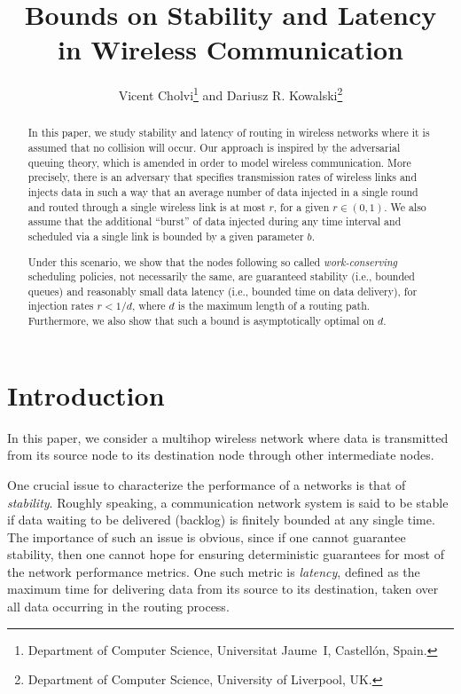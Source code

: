 \documentclass[journal,twocolumn]{./IEEEtran}
\begin{document}
\title{Bounds on Stability and Latency\\ in Wireless Communication}
\author{Vicent Cholvi\thanks{Department of Computer Science, Universitat Jaume~I, Castell\'on, Spain.}
and
Dariusz R. Kowalski\thanks{Department of Computer Science, University of Liverpool, UK.}
}

\date{}

\maketitle

\begin{abstract}
In this paper, we study stability and latency of routing in wireless networks where it is assumed that no collision will occur.  Our approach is inspired by the adversarial queuing theory, which is amended in order to model wireless communication. More precisely, there is an adversary that specifies transmission rates of wireless links and injects data in such a way that an average number of data injected in a single round and routed through a single
wireless link is at most $r$, for a given $r\in (0,1)$. We also assume that the additional ``burst'' of data injected during any time interval and scheduled via a single link is bounded by a given parameter $b$.

Under this scenario, we show that the nodes following so called {\em work-conserving} scheduling policies, not necessarily 
the same, are guaranteed stability (i.e., bounded queues) and reasonably small data latency (i.e., bounded time on data delivery), 
for injection rates $r<1/d$, where $d$ is the maximum length of a routing path. Furthermore, we also show that such a bound is asymptotically optimal on $d$.
\end{abstract}











\section{Introduction}

In this paper, we consider a multihop wireless network where data is transmitted from its source node to its destination node through other intermediate nodes.


One crucial issue to characterize the performance of a networks is that of \emph{stability}. Roughly speaking, a communication network system is said to be stable if data waiting to be delivered (backlog) is finitely bounded at any 
single
time. The importance of such an issue is obvious, since if one cannot guarantee stability, then one cannot hope 
for ensuring
deterministic guarantees for most of the network performance metrics.
One such metric is {\em latency}, defined as the maximum time
for delivering data from its source to its destination, taken over all data
occurring in the routing process.
\end{document}
